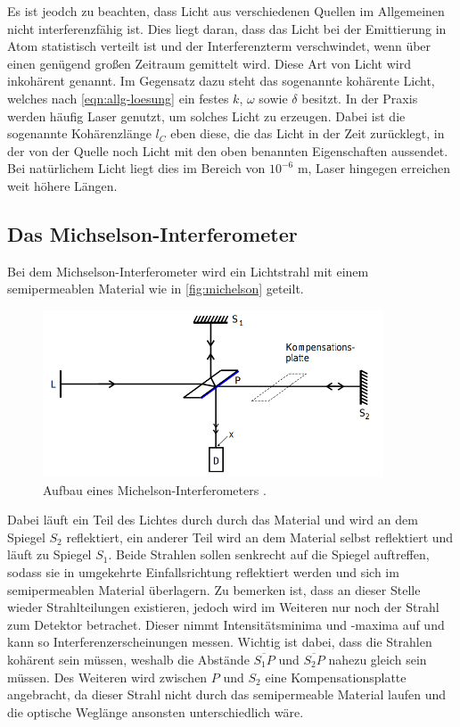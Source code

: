 Es ist jeodch zu beachten, dass Licht aus verschiedenen Quellen im Allgemeinen nicht interferenzfähig ist.
Dies liegt daran, dass das Licht bei der Emittierung in Atom statistisch verteilt ist und der Interferenzterm verschwindet, wenn über einen genügend großen Zeitraum gemittelt wird.
Diese Art von Licht wird inkohärent genannt. Im Gegensatz dazu steht das sogenannte kohärente Licht, welches nach \eqref{eqn:allg-loesung} ein festes $k$, $\omega$ sowie $\delta$ besitzt.
In der Praxis werden häufig Laser genutzt, um solches Licht zu erzeugen.
Dabei ist die sogenannte Kohärenzlänge $l_C$ eben diese, die das Licht in der Zeit zurücklegt, in der von der Quelle noch Licht mit den oben benannten Eigenschaften aussendet.
Bei natürlichem Licht liegt dies im Bereich von $10^{-6}$ m, Laser hingegen erreichen weit höhere Längen.

\subsection{Das Michselson-Interferometer}

Bei dem Michselson-Interferometer wird ein Lichtstrahl mit einem semipermeablen Material wie in \autoref{fig:michelson} geteilt.

\begin{figure}
    \centering
    \includegraphics[width=0.9\textwidth]{content/michelson.png}
    \caption{Aufbau eines Michelson-Interferometers \cite{V401}.}
    \label{fig:michelson}
\end{figure}

Dabei läuft ein Teil des Lichtes durch durch das Material und wird an dem Spiegel $S_2$ reflektiert, ein anderer Teil wird an dem Material selbst reflektiert und läuft zu Spiegel $S_1$.
Beide Strahlen sollen senkrecht auf die Spiegel auftreffen, sodass sie in umgekehrte Einfallsrichtung reflektiert werden und sich im semipermeablen Material überlagern. Zu bemerken ist, dass an dieser Stelle wieder Strahlteilungen existieren, jedoch wird im Weiteren nur noch der Strahl zum Detektor betrachet.
Dieser nimmt Intensitätsminima und -maxima auf und kann so Interferenzerscheinungen messen.
Wichtig ist dabei, dass die Strahlen kohärent sein müssen, weshalb die Abstände $\overline{S_1P}$ und $\overline{S_2P}$ nahezu gleich sein müssen.
Des Weiteren wird zwischen $P$ und $S_2$ eine Kompensationsplatte angebracht, da dieser Strahl nicht durch das semipermeable Material laufen und die optische Weglänge ansonsten unterschiedlich wäre.

